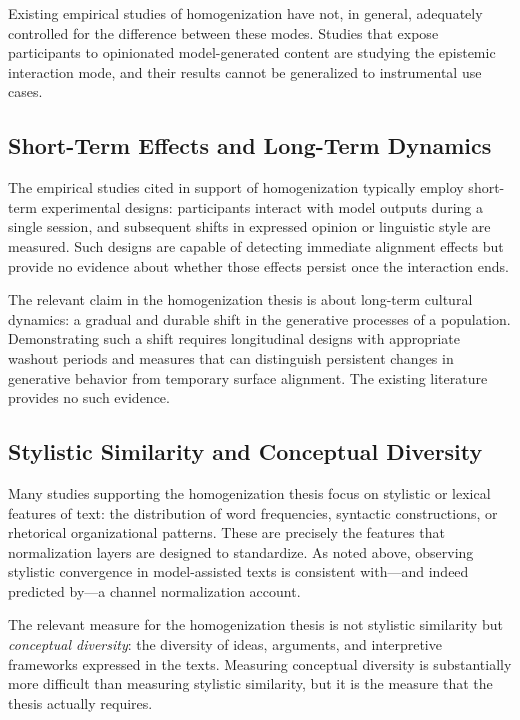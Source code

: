 \documentclass[12pt,a4paper]{article}
\theoremstyle{definition}
\theoremstyle{plain}
\theoremstyle{remark}
\begin{document}
Existing empirical studies of homogenization have not, in general, adequately controlled for
the difference between these modes. Studies that expose participants to opinionated
model-generated content are studying the epistemic interaction mode, and their results cannot
be generalized to instrumental use cases.

\subsection{Short-Term Effects and Long-Term Dynamics}

The empirical studies cited in support of homogenization typically employ short-term
experimental designs: participants interact with model outputs during a single session, and
subsequent shifts in expressed opinion or linguistic style are measured. Such designs are
capable of detecting immediate alignment effects but provide no evidence about whether those
effects persist once the interaction ends.

The relevant claim in the homogenization thesis is about long-term cultural dynamics: a
gradual and durable shift in the generative processes of a population. Demonstrating such a
shift requires longitudinal designs with appropriate washout periods and measures that can
distinguish persistent changes in generative behavior from temporary surface alignment. The
existing literature provides no such evidence.

\subsection{Stylistic Similarity and Conceptual Diversity}

Many studies supporting the homogenization thesis focus on stylistic or lexical features of
text: the distribution of word frequencies, syntactic constructions, or rhetorical
organizational patterns. These are precisely the features that normalization layers are
designed to standardize. As noted above, observing stylistic convergence in model-assisted
texts is consistent with---and indeed predicted by---a channel normalization account.

The relevant measure for the homogenization thesis is not stylistic similarity but
\emph{conceptual diversity}: the diversity of ideas, arguments, and interpretive frameworks
expressed in the texts. Measuring conceptual diversity is substantially more difficult than
measuring stylistic similarity, but it is the measure that the thesis actually requires.
\end{document}
